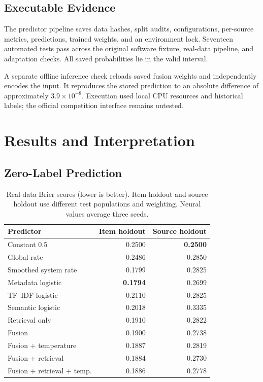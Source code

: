 \documentclass[conference]{IEEEtran}
\begin{document}
\subsection{Executable Evidence}
The predictor pipeline saves data hashes, split audits, configurations, per-source metrics, predictions, trained weights, and an environment lock. Seventeen automated tests pass across the original software fixture, real-data pipeline, and adaptation checks. All saved probabilities lie in the valid interval.

A separate offline inference check reloads saved fusion weights and independently encodes the input. It reproduces the stored prediction to an absolute difference of approximately $3.9\times10^{-8}$. Execution used local CPU resources and historical labels; the official competition interface remains untested.

\section{Results and Interpretation}
\subsection{Zero-Label Prediction}
\begin{table}[t]
\caption{Real-data Brier scores (lower is better). Item holdout and source holdout use different test populations and weighting. Neural values average three seeds.}
\label{tab:results}\centering\small
\begin{tabular}{@{}lrr@{}}
\toprule
Predictor & Item holdout & Source holdout \\
\midrule
Constant 0.5 & 0.2500 & \textbf{0.2500} \\
Global rate & 0.2486 & 0.2850 \\
Smoothed system rate & 0.1799 & 0.2825 \\
Metadata logistic & \textbf{0.1794} & 0.2699 \\
TF--IDF logistic & 0.2110 & 0.2825 \\
Semantic logistic & 0.2018 & 0.3335 \\
Retrieval only & 0.1910 & 0.2822 \\
Fusion & 0.1900 & 0.2738 \\
Fusion + temperature & 0.1887 & 0.2819 \\
Fusion + retrieval & 0.1884 & 0.2730 \\
Fusion + retrieval + temp. & 0.1886 & 0.2778 \\
\bottomrule
\end{tabular}
\end{table}
\end{document}
